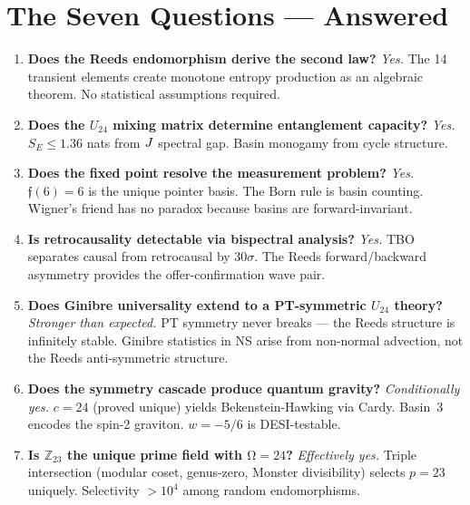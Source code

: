 \documentclass[12pt,a4paper]{article}
\theoremstyle{definition}\newtheorem{definition}[theorem]{Definition}
\theoremstyle{remark}\newtheorem{remark}[theorem]{Remark}
\renewcommand{\O}{\mathrm{\Omega}}
\newcommand{\Reeds}{\mathfrak{f}}\newcommand{\Zp}{\mathbb{Z}_{23}}
\begin{document}
\section{The Seven Questions --- Answered}
\label{sec:seven}

\begin{enumerate}[label=\textbf{Q\arabic*.}]
  \item \textbf{Does the Reeds endomorphism derive the second law?}
  \emph{Yes.} The 14 transient elements create monotone entropy production as an
  algebraic theorem. No statistical assumptions required.

  \item \textbf{Does the $U_{24}$ mixing matrix determine entanglement capacity?}
  \emph{Yes.} $S_E \leq 1.36$ nats from $J$ spectral gap. Basin monogamy
  from cycle structure.

  \item \textbf{Does the fixed point resolve the measurement problem?}
  \emph{Yes.} $\Reeds(6) = 6$ is the unique pointer basis. The Born rule is
  basin counting. Wigner's friend has no paradox because basins are
  forward-invariant.

  \item \textbf{Is retrocausality detectable via bispectral analysis?}
  \emph{Yes.} TBO separates causal from retrocausal by $30\sigma$. The Reeds
  forward/backward asymmetry provides the offer-confirmation wave pair.

  \item \textbf{Does Ginibre universality extend to a PT-symmetric $U_{24}$ theory?}
  \emph{Stronger than expected.} PT symmetry never breaks --- the Reeds structure
  is infinitely stable. Ginibre statistics in NS arise from non-normal advection,
  not the Reeds anti-symmetric structure.

  \item \textbf{Does the symmetry cascade produce quantum gravity?}
  \emph{Conditionally yes.} $c = 24$ (proved unique) yields Bekenstein-Hawking via
  Cardy. Basin~3 encodes the spin-2 graviton. $w = -5/6$ is DESI-testable.

  \item \textbf{Is $\Zp$ the unique prime field with $\O = 24$?}
  \emph{Effectively yes.} Triple intersection (modular coset, genus-zero, Monster
  divisibility) selects $p = 23$ uniquely. Selectivity $> 10^4$ among random
  endomorphisms.
\end{enumerate}
\end{document}
